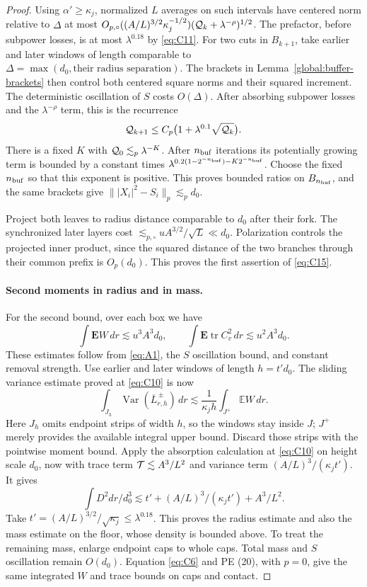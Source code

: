 \begin{proof}
Using \(\alpha'\ge\kappa_j\), normalized \(L\) averages on such intervals have centered norm relative to \(\Delta\) at most
\(O_{p,\circ}((A/L)^{3/2}\kappa_j^{-1/2})({\cal Q}_k+\lambda^{-\rho})^{1/2}\).
The prefactor, before subpower losses, is at most
\(\lambda^{0.18}\) by \eqref{eq:C11}. For two cuts in
\(B_{k+1}\), take earlier and later windows of length comparable to
\(\Delta=\max(d_0,\text{their radius separation})\).
The brackets in Lemma~\ref{global:buffer-brackets} then control
both centered square norms and their squared increment. The
deterministic oscillation of \(S\) costs \(O(\Delta)\). After
absorbing subpower losses and the \(\lambda^{-\rho}\) term, this is
the recurrence
\[
 {\cal Q}_{k+1}\le C_p\bigl(1+\lambda^{0.1}\sqrt{{\cal Q}_k}\bigr).
\]
There is a fixed \(K\) with \({\cal Q}_0\lesssim_p\lambda^{-K}\).
After \(n_{\rm buf}\) iterations its potentially growing term is bounded by a
constant times
\(\lambda^{0.2(1-2^{-n_{\rm buf}})-K2^{-n_{\rm buf}}}\).
Choose the fixed \(n_{\rm buf}\)
so that this exponent is positive. This proves bounded ratios on
\(B_{n_{\rm buf}}\), and the same brackets give
\(\||X_i|^2-S_i\|_p\lesssim_p d_0\).

Project both leaves to radius distance comparable to \(d_0\) after
their fork. The synchronized later layers cost
\(\lesssim_{p,\circ}uA^{3/2}/\sqrt L\ll d_0\).
Polarization controls the projected inner product, since the squared
distance of the two branches through their common prefix is
\(O_p(d_0)\). This proves the first assertion of \eqref{eq:C15}.


\paragraph{Second moments in radius and in mass.}

For the second bound, over each box we have
\[
 \int\mathbf EW\,dr\lesssim u^3 A^3d_0,\qquad
 \int\mathbf E\operatorname{tr}C_v^2\,dr\lesssim u^2 A^3d_0.
\]
These estimates follow from \eqref{eq:A1}, the \(S\) oscillation
bound, and constant removal strength. Use earlier and later windows of
length \(h=t'd_0\). The sliding variance estimate proved at
\eqref{eq:C10} is now
\[
 \int_{J_h}\operatorname{Var}(\overline L^{\,\pm}_{r,h})\,dr
 \lesssim\frac1{\kappa_jh}\int_{J^+}\mathbb EW\,dr.
\]
Here \(J_h\) omits endpoint strips of width \(h\), so the windows
stay inside \(J\); \(J^+\) merely provides the available integral
upper bound. Discard those strips with the pointwise moment bound.
Apply the absorption calculation at \eqref{eq:C10} on height scale
\(d_0\), now with trace term \({\cal T}\lesssim A^3/L^2\) and
variance term \((A/L)^3/(\kappa_jt')\). It gives
\[
 \int D^2dr/d_0^3\lesssim t'+(A/L)^3/(\kappa_j t')+A^3/L^2.
\]
Take \(t'=(A/L)^{3/2}/\sqrt{\kappa_j}\le\lambda^{0.18}\).
This proves the radius estimate and also the mass estimate on the floor,
whose density is bounded above. To treat the remaining mass, enlarge
endpoint caps to whole caps. Total mass and \(S\) oscillation remain
\(O(d_0)\). Equation \eqref{eq:C6} and PE (20), with \(p=0\),
give the same integrated \(W\) and trace bounds on caps and contact.


\end{proof}
